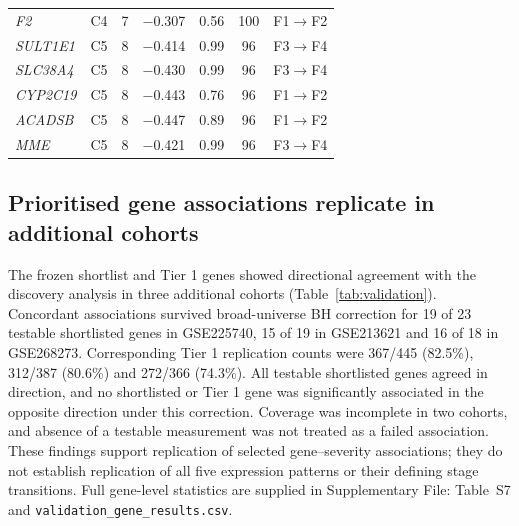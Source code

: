 \documentclass[11pt,a4paper]{article}
\begin{document}
\begin{table}[!t]
\begin{tabular}{llcrccl}
\textit{F2} & C4 & 7 & $-$0.307 & 0.56 & 100 & F1$\rightarrow$F2 \\
\textit{SULT1E1} & C5 & 8 & $-$0.414 & 0.99 & 96 & F3$\rightarrow$F4 \\
\textit{SLC38A4} & C5 & 8 & $-$0.430 & 0.99 & 96 & F3$\rightarrow$F4 \\
\textit{CYP2C19} & C5 & 8 & $-$0.443 & 0.76 & 96 & F1$\rightarrow$F2 \\
\textit{ACADSB} & C5 & 8 & $-$0.447 & 0.89 & 96 & F1$\rightarrow$F2 \\
\textit{MME} & C5 & 8 & $-$0.421 & 0.99 & 96 & F3$\rightarrow$F4 \\
\bottomrule
\end{tabular}
\end{table}

\subsection*{Prioritised gene associations replicate in additional cohorts}
The frozen shortlist and Tier 1 genes showed directional agreement with the discovery analysis in three additional cohorts (Table~\ref{tab:validation}). Concordant associations survived broad-universe BH correction for 19 of 23 testable shortlisted genes in GSE225740, 15 of 19 in GSE213621 and 16 of 18 in GSE268273. Corresponding Tier 1 replication counts were 367/445 (82.5\%), 312/387 (80.6\%) and 272/366 (74.3\%). All testable shortlisted genes agreed in direction, and no shortlisted or Tier 1 gene was significantly associated in the opposite direction under this correction. Coverage was incomplete in two cohorts, and absence of a testable measurement was not treated as a failed association. These findings support replication of selected gene--severity associations; they do not establish replication of all five expression patterns or their defining stage transitions. Full gene-level statistics are supplied in Supplementary File: Table~S7 and \nolinkurl{validation_gene_results.csv}.
\end{document}
